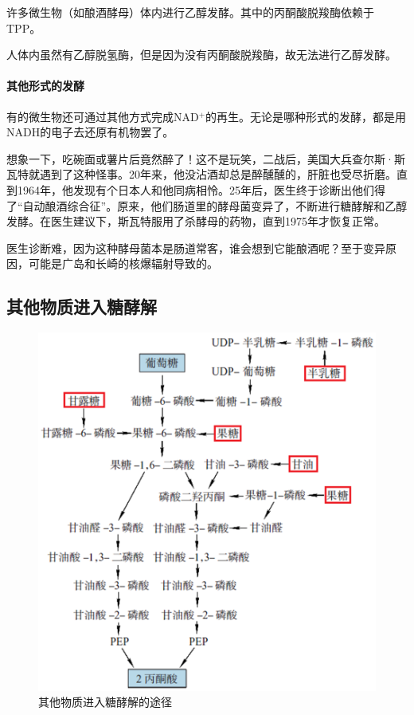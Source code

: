 许多微生物（如酿酒酵母）体内进行乙醇发酵。其中的丙酮酸脱羧酶依赖于TPP。

人体内虽然有乙醇脱氢酶，但是因为没有丙酮酸脱羧酶，故无法进行乙醇发酵。

\paragraph{其他形式的发酵}

有的微生物还可通过其他方式完成NAD$^{+}$的再生。无论是哪种形式的发酵，都是用NADH的电子去还原有机物罢了。

\begin{gs}[：不喝酒也醉酒的秘密]
	
	\hspace{2em}想象一下，吃碗面或薯片后竟然醉了！这不是玩笑，二战后，美国大兵查尔斯·斯瓦特就遇到了这种怪事。20年来，他没沾酒却总是醉醺醺的，肝脏也受尽折磨。直到1964年，他发现有个日本人和他同病相怜。25年后，医生终于诊断出他们得了“自动酿酒综合征”。原来，他们肠道里的酵母菌变异了，不断进行糖酵解和乙醇发酵。在医生建议下，斯瓦特服用了杀酵母的药物，直到1975年才恢复正常。
	
	\hspace{2em}医生诊断难，因为这种酵母菌本是肠道常客，谁会想到它能酿酒呢？至于变异原因，可能是广岛和长崎的核爆辐射导致的。
\end{gs}

\subsection{其他物质进入糖酵解}

\begin{figure}[htbp]
	\centering
	\includegraphics[width=0.8\linewidth]{Pics/其他物质进入糖酵解}
	\caption{其他物质进入糖酵解的途径}
	\label{fig:其他物质进入糖酵解的途径}
\end{figure}

